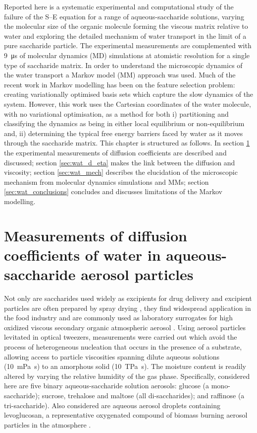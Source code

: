 Reported here is a systematic experimental and computational study of the failure of the S–E equation for a range of aqueous-saccharide solutions, varying the molecular size of the organic molecule forming the viscous matrix relative to water and exploring the detailed mechanism of water transport in the limit of a pure saccharide particle. The experimental measurements are complemented with \SI{9}{\micro\second} of molecular dynamics (MD) simulations at atomistic resolution for a single type of saccharide matrix.  In order to understand the microscopic dynamics of the water transport a Markov model (MM) approach was used. Much of the recent work \cite{schererVariationalSelectionFeatures2019,husicMarkovStateModels2018} in Markov modelling has been on the feature selection problem: creating variationally optimised basis sets which capture the slow dynamics of the system. However, this work uses the Cartesian coordinates of the water molecule, with no variational optimisation, as a method for both i) partitioning and classifying the dynamics as being in either local equilibrium or non-equilibrium and, ii) determining the typical free energy barriers faced by water as it moves through the saccharide matrix. This chapter is structured as follows. In section \ref{sec:wat_d_coefs} the experimental measurements of diffusion coefficients are described and discussed; section \ref{sec:wat_d_eta} makes the link  between the diffusion and viscosity; section \ref{sec:wat_mech} describes the elucidation of the microscopic mechanism from molecular dynamics simulations and MMs; section \ref{sec:wat_conclusions} concludes and discusses limitations of the Markov modelling. 

\section{Measurements of diffusion coefficients of water in aqueous-saccharide aerosol particles}\label{sec:wat_d_coefs}

Not only are saccharides used widely as excipients for drug delivery \cite{Zhao2009,Sinha2001,Sastry2000} and excipient particles are often prepared by spray drying \cite{Andya1999,Vehring2008,Mosen2004}, they find widespread application in the food industry and are commonly used as laboratory surrogates for high oxidized viscous secondary organic atmospheric aerosol \cite{Koop2011,Bones2012,Liu2006,Zobrist2008,Reid2018,Song2016a}. Using aerosol particles levitated in optical tweezers, measurements were  carried out  which avoid the process of heterogeneous nucleation that occurs in the presence of a substrate, allowing access to particle viscosities spanning dilute aqueous solutions (\SI{10}{\milli\pascal\second}) to an amorphous solid (\SI{10}{\tera\pascal\second}). The moisture content is readily altered by varying the relative humidity of the gas phase. Specifically, considered here are five binary aqueous-saccharide solution aerosols: glucose (a mono-saccharide); sucrose, trehalose and maltose (all di-saccharides); and raffinose (a tri-saccharide). Also considered are aqueous aerosol droplets containing levoglucosan, a representative oxygenated compound of biomass burning aerosol particles in the atmosphere \cite{Decesari2006}.


